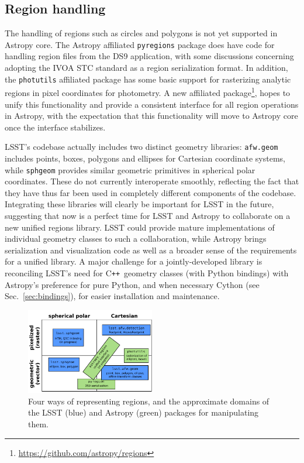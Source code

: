 \documentclass[]{spie}  %
\newcommand{\CPP}{C\texttt{++}\xspace}  %
\begin{document}
\subsection{Region handling}

The handling of regions such as circles and polygons is not yet supported in Astropy core.
The Astropy affiliated \texttt{pyregions} package does have code for handling region files from the DS9 application\cite{2005ASPC..347..110J}, with some discussions concerning adopting the IVOA STC standard\cite{2007ivoa.spec.1030R} as a region serialization format.
In addition, the \texttt{photutils} affiliated package has some basic support for rasterizing analytic regions in pixel coordinates for photometry.
A new affiliated package\footnote{\url{https://github.com/astropy/regions}}, hopes to unify this functionality and provide a consistent interface for all region operations in Astropy, with the expectation that this functionality will move to Astropy core once the interface stabilizes.

LSST's codebase actually includes two distinct geometry libraries:
\texttt{afw.geom} includes points, boxes, polygons and ellipses for Cartesian coordinate systems, while \texttt{sphgeom} provides similar geometric primitives in spherical polar coordinates.
These do not currently interoperate smoothly, reflecting the fact that they have thus far been used in completely different components of the codebase.
Integrating these libraries will clearly be important for LSST in the future, suggesting that now is a perfect time for LSST and Astropy to collaborate on a new unified regions library.
LSST could provide mature implementations of individual geometry classes to such a collaboration, while Astropy brings serialization and visualization code as well as a broader sense of the requirements for a unified library.
A major challenge for a jointly-developed library is reconciling LSST's need for \CPP\ geometry classes (with Python bindings) with Astropy's preference for pure Python, and when necessary Cython (see Sec.~\ref{sec:bindings}), for easier installation and maintenance.

\begin{figure}[t]
\begin{center}
\includegraphics[width=0.5\textwidth]{regions}
\end{center}
\caption{Four ways of representing regions, and the approximate domains of the LSST (blue) and Astropy (green) packages for manipulating them.}
\label{fig:regions}
\end{figure}
\end{document}
